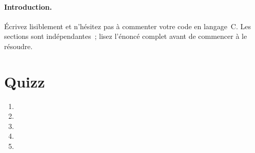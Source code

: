 \documentclass[ds]{sujet}
\begin{document}
\formation{} 
\matiere{}  
\auteur{} 
\def\SujetClsNumero{}

\paragraph{Introduction.}
\'Ecrivez lisiblement et n'h\'esitez pas \`a commenter votre code en
langage~C. Les sections sont ind\'ependantes~; lisez l'\'enonc\'e
complet avant de commencer \`a le r\'esoudre.
\section{Quizz}
\begin{enumerate}
\item
\item
\item
\item
\item
\end{enumerate}




\end{document}
